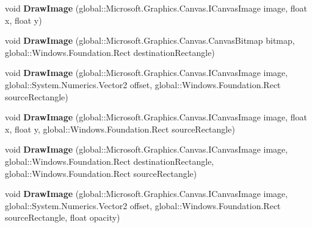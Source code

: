 \begin{DoxyCompactItemize}
void {\bfseries Draw\+Image} (global\+::\+Microsoft.\+Graphics.\+Canvas.\+I\+Canvas\+Image image, float x, float y)
\item 
\mbox{\label{interface_microsoft_1_1_graphics_1_1_canvas_1_1_i_canvas_drawing_session_a217624e9b6fad3572752f97968e22579}} 
void {\bfseries Draw\+Image} (global\+::\+Microsoft.\+Graphics.\+Canvas.\+Canvas\+Bitmap bitmap, global\+::\+Windows.\+Foundation.\+Rect destination\+Rectangle)
\item 
\mbox{\label{interface_microsoft_1_1_graphics_1_1_canvas_1_1_i_canvas_drawing_session_a9daab3a40c2194f97c638edb082a9c04}} 
void {\bfseries Draw\+Image} (global\+::\+Microsoft.\+Graphics.\+Canvas.\+I\+Canvas\+Image image, global\+::\+System.\+Numerics.\+Vector2 offset, global\+::\+Windows.\+Foundation.\+Rect source\+Rectangle)
\item 
\mbox{\label{interface_microsoft_1_1_graphics_1_1_canvas_1_1_i_canvas_drawing_session_a397cb8eca23ad1da1455e9c0f2c950e7}} 
void {\bfseries Draw\+Image} (global\+::\+Microsoft.\+Graphics.\+Canvas.\+I\+Canvas\+Image image, float x, float y, global\+::\+Windows.\+Foundation.\+Rect source\+Rectangle)
\item 
\mbox{\label{interface_microsoft_1_1_graphics_1_1_canvas_1_1_i_canvas_drawing_session_a7eadc4d8ba4b2ff60ad5e82583afa018}} 
void {\bfseries Draw\+Image} (global\+::\+Microsoft.\+Graphics.\+Canvas.\+I\+Canvas\+Image image, global\+::\+Windows.\+Foundation.\+Rect destination\+Rectangle, global\+::\+Windows.\+Foundation.\+Rect source\+Rectangle)
\item 
\mbox{\label{interface_microsoft_1_1_graphics_1_1_canvas_1_1_i_canvas_drawing_session_ac7b5a66f8426e0e819dd7e8e14011132}} 
void {\bfseries Draw\+Image} (global\+::\+Microsoft.\+Graphics.\+Canvas.\+I\+Canvas\+Image image, global\+::\+System.\+Numerics.\+Vector2 offset, global\+::\+Windows.\+Foundation.\+Rect source\+Rectangle, float opacity)
\item 
\mbox{\label{interface_microsoft_1_1_graphics_1_1_canvas_1_1_i_canvas_drawing_session_a21d76b9febfc14d4e7de5fc50a90605d}} 

\end{DoxyCompactItemize}
